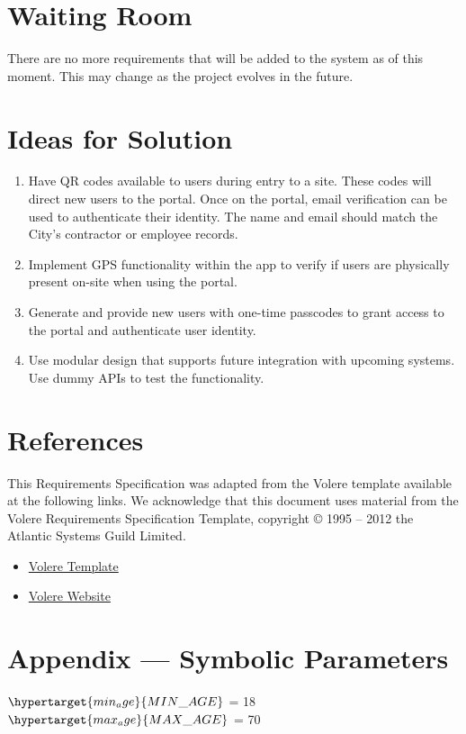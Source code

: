\documentclass[12pt]{article}
\begin{document}
\section{Waiting Room}
There are no more requirements that will be added to the system as of this
moment. This may change as the project evolves in the future.

\section{Ideas for Solution}
\begin{enumerate}
  \item Have QR codes available to users during entry to a site.
    These codes will direct new users to the portal. Once on the
    portal, email verification can be used to authenticate their
    identity. The name and email should match the City's contractor
    or employee records.
  \item Implement GPS functionality within the app to verify if users
    are physically present on-site when using the portal.
  \item Generate and provide new users with one-time passcodes to
    grant access to the portal and authenticate user identity.
  \item Use modular design that supports future integration with
    upcoming systems. Use dummy APIs to test the functionality.
\end{enumerate}

\section{References}
This Requirements Specification was adapted from the Volere template available at the following links. 
We acknowledge that this document uses material from the Volere Requirements
Specification Template, copyright © 1995 – 2012 the Atlantic Systems Guild Limited.
\begin{itemize}
\item \href{https://www.cs.uic.edu/~i440/VolereMaterials/templateArchive16/c%20Volere%20template16.pdf}{Volere Template}
\item \href{https://www.volere.org/templates/volere-requirements-specification-template/}{Volere Website}
\end{itemize}

\newpage{}
\section*{Appendix --- Symbolic Parameters}
$\hypertarget{min_age}{MIN\_AGE}$ = 18\\
$\hypertarget{max_age}{MAX\_AGE}$ = 70
\end{document}
